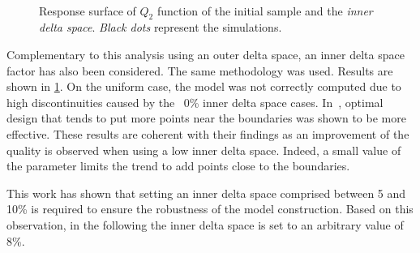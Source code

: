 \begin{figure}[ht]               
\centering
{}
 ~       
\caption{Response surface of $Q_2$ function of the initial sample and the \textit{inner delta space}. \emph{Black dots} represent the simulations.}
\label{fig:inner-delta}
\end{figure}

Complementary to this analysis using an outer delta space, an inner delta space factor has also been considered. The same methodology was used. Results are shown in \cref{fig:inner-delta}. On the uniform case, the model was not correctly computed due to high discontinuities caused by the ~0\% inner delta space cases. In~\cite{dette2010}, optimal design that tends to put more points near the boundaries was shown to be more effective. These results are coherent with their findings as an improvement of the quality is observed when using a low inner delta space. Indeed, a small value of the parameter limits the trend to add points close to the boundaries.

This work has shown that setting an inner delta space comprised between 5 and 10\% is required to ensure the robustness of the model construction. Based on this observation, in the following the inner delta space is set to an arbitrary value of 8\%.

